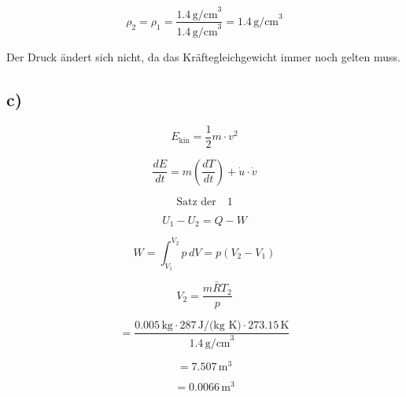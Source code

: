 \[
\rho_2 = \rho_1 = \frac{1.4 \, \text{g/cm}^3}{1.4 \, \text{g/cm}^3} = 1.4 \, \text{g/cm}^3
\]

Der Druck ändert sich nicht, da das Kräftegleichgewicht immer noch gelten muss.

\subsection*{c)}

\[
E_{\text{kin}} = \frac{1}{2} m \cdot v^2
\]

\[
\frac{dE}{dt} = m \left( \frac{dT}{dt} \right) + \dot{u} \cdot \dot{v}
\]

\[
\text{Satz der} \quad 1
\]

\[
U_1 - U_2 = Q - W
\]

\[
W = \int_{V_1}^{V_2} p \, dV = p(V_2 - V_1)
\]

\[
V_2 = \frac{m \bar{R} T_2}{p}
\]

\[
= \frac{0.005 \, \text{kg} \cdot 287 \, \text{J/(kg K)} \cdot 273.15 \, \text{K}}{1.4 \, \text{g/cm}^3}
\]

\[
= 7.507 \, \text{m}^3
\]

\[
= 0.0066 \, \text{m}^3
\]

